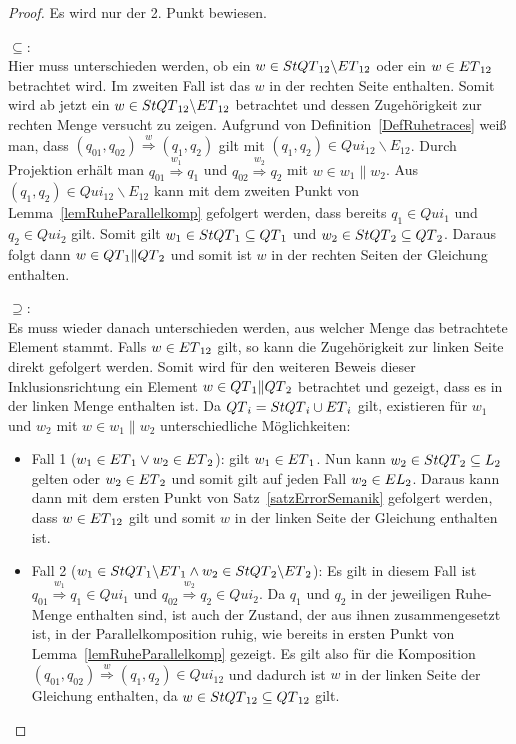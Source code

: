 \begin{proof}
  Es wird nur der 2. Punkt bewiesen.

  \glqq{}$\subseteq$\grqq{}:\\
  Hier muss unterschieden werden, ob ein $w\in StQT{}_{12}\backslash ET{}_{12}$
  oder ein $w\in ET{}_{12}$ betrachtet wird. Im zweiten Fall ist das
  $w$ in der rechten Seite enthalten. Somit wird ab jetzt ein $w\in
  StQT{}_{12}\backslash ET{}_{12}$ betrachtet und dessen Zugehörigkeit zur
  rechten Menge versucht zu zeigen. Aufgrund von
  Definition~\ref{DefRuhetraces} weiß man, dass $(q_{01},q_{02})
  \overset{w}{\Rightarrow} (q_1,q_2)$ gilt mit $(q_1,q_2)\in Qui_{12}\backslash
  E_{12}$. Durch Projektion erhält man $q_{01} \overset{w_1}{\Rightarrow} q_1$
  und $q_{02} \overset{w_2}{\Rightarrow} q_2$ mit $w\in w_1\|w_2$. Aus
  $(q_1,q_2)\in Qui_{12}\backslash E_{12}$ kann mit dem zweiten Punkt von
  Lemma~\ref{lemRuheParallelkomp} gefolgert werden, dass bereits $q_1\in Qui_1$
  und $q_2\in Qui_2$ gilt. Somit gilt $w_1\in StQT{}_1\subseteq QT{}_1$ und
  $w_2\in StQT{}_2\subseteq QT{}_2$. Daraus folgt dann $w\in
  QT{}_1\|QT{}_2$ und somit ist $w$ in der rechten Seiten der Gleichung
  enthalten.

  \glqq{}$\supseteq$\grqq{}:\\
  Es muss wieder danach unterschieden werden, aus welcher Menge das betrachtete
  Element stammt. Falls $w\in ET{}_{12}$ gilt, so kann die
  Zugehörigkeit zur linken Seite direkt gefolgert werden. Somit wird für den
  weiteren Beweis dieser Inklusionsrichtung ein Element $w\in QT{}_1\|QT{}_2$
  betrachtet und gezeigt, dass es in der linken Menge enthalten ist. Da
  $QT{}_i = StQT{}_i\cup ET{}_i$ gilt, existieren für $w_1$ und $w_2$ mit
  $w\in w_1\| w_2$ unterschiedliche Möglichkeiten:
  \begin{itemize}
    \item Fall 1 ($w_1\in ET{}_1\vee w_2\in ET{}_2$): \OBdA{} gilt
      $w_1\in ET{}_1$. Nun kann $w_2\in StQT{}_2\subseteq L_2$ gelten
      oder $w_2\in ET{}_2$ und somit gilt auf jeden Fall $w_2\in
      EL{}_2$. Daraus kann dann mit dem ersten Punkt von
      Satz~\ref{satzErrorSemanik} gefolgert werden, dass $w\in ET{}_{12}$ gilt
      und somit $w$ in der linken Seite der Gleichung enthalten ist.
    \item Fall 2 ($w_1\in StQT{}_1\backslash ET{}_1\wedge w_2\in
      StQT{}_2\backslash ET{}_2$): Es gilt in diesem Fall ist $q_{01}
      \overset{w_1}{\Rightarrow} q_1\in Qui_1$ und $q_{02}
      \overset{w_2}{\Rightarrow} q_2\in Qui_2$. Da $q_1$ und $q_2$ in der
      jeweiligen Ruhe-Menge enthalten sind, ist auch der Zustand, der aus ihnen
      zusammengesetzt ist, in der Parallelkomposition ruhig, wie bereits in
      ersten Punkt von
      Lemma~\ref{lemRuheParallelkomp} gezeigt. Es gilt also für die Komposition
      $(q_{01},q_{02}) \overset{w}{\Rightarrow} (q_1,q_2)\in Qui_{12}$ und
      dadurch ist $w$ in der linken Seite der Gleichung enthalten, da $w\in
      StQT{}_{12}\subseteq QT{}_{12}$ gilt.
  \end{itemize}
\end{proof}

